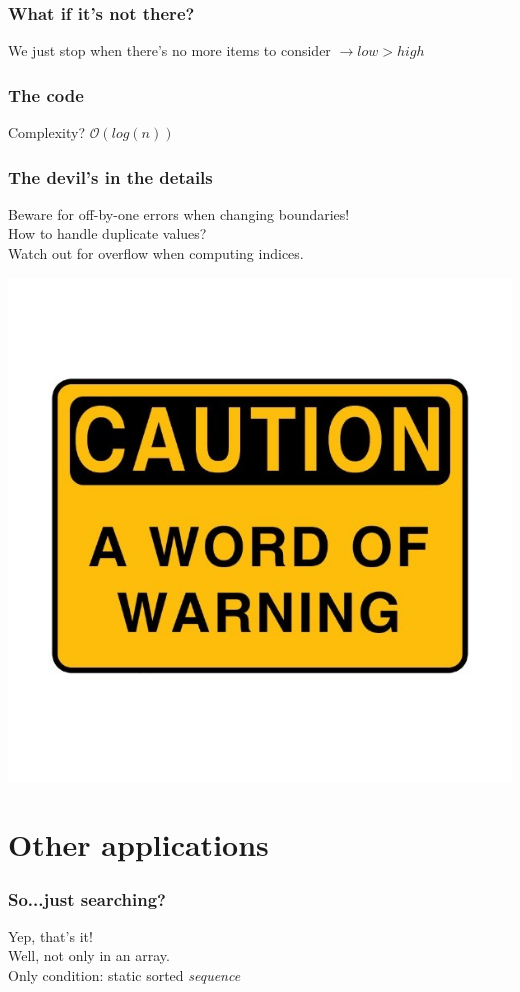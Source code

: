 \documentclass[12pt]{beamer}
\newcommand{\bigoh}[1]{\mathcal{O}\left(#1\right)}
\newcommand{\blank}{\vspace{.5cm}}
\begin{document}
\begin{frame}
	\frametitle{What if it's not there?}
	We just stop when there's no more items to consider $\rightarrow low > high$
\end{frame}

\begin{frame}
	\frametitle{The code}
	 \pause \blank
	Complexity? $\bigoh{log(n)}$
\end{frame}

\begin{frame}
	\frametitle{The devil's in the details}
	Beware for off-by-one errors when changing boundaries!\\
	How to handle duplicate values?\\
	Watch out for overflow when computing indices.
	\begin{center}
		\includegraphics[scale=0.2]{img/caution.jpg}
	\end{center}
\end{frame}
\section{Other applications}
\begin{frame}
	\frametitle{So...just searching?}
	Yep, that's it!\pause\\
	Well, not only in an array.\pause\\
	Only condition: static sorted \textit{sequence}
\end{frame}
\end{document}
